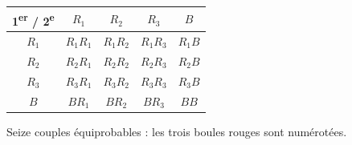 \begin{center}\renewcommand{\arraystretch}{1.35}\begin{tabular}{c|cccc}\toprule
1\textsuperscript{er} / 2\textsuperscript{e} & $R_1$ & $R_2$ & $R_3$ & $B$\\\midrule
$R_1$ & $R_1R_1$ & $R_1R_2$ & $R_1R_3$ & $R_1B$\\
$R_2$ & $R_2R_1$ & $R_2R_2$ & $R_2R_3$ & $R_2B$\\
$R_3$ & $R_3R_1$ & $R_3R_2$ & $R_3R_3$ & $R_3B$\\
$B$ & $BR_1$ & $BR_2$ & $BR_3$ & $BB$\\
\bottomrule\end{tabular}\end{center}
{\par\smallskip\fontsize{8}{10}\selectfont\color{otMuted}Seize couples équiprobables : les trois boules rouges sont numérotées.\par}

